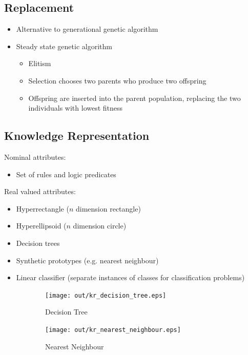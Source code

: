 \documentclass[a4paper]{article}
\begin{document}
\subsection{Replacement}

\begin{itemize}
  \item Alternative to generational genetic algorithm
  \item Steady state genetic algorithm
    \begin{itemize}
      \item Elitism
      \item Selection chooses two parents who produce two offspring
      \item Offspring are inserted into the parent population, replacing the
            two individuals with lowest fitness
    \end{itemize}
\end{itemize}

\subsection{Knowledge Representation}

Nominal attributes:

\begin{itemize}
  \item Set of rules and logic predicates
\end{itemize}

Real valued attributes:

\begin{itemize}
  \item Hyperrectangle ($n$ dimension rectangle)
  \item Hyperellipsoid ($n$ dimension circle)
  \item Decision trees
  \item Synthetic prototypes (e.g. nearest neighbour)
  \item Linear classifier (separate instances of classes for classification
        problems)
\end{itemize}

\begin{figure}[h]
  \centering
  \begin{subfigure}[b]{0.4\textwidth}
    \texttt{[image: out/kr\_decision\_tree.eps]}
    \caption{Decision Tree}
  \end{subfigure}
  \begin{subfigure}[b]{0.4\textwidth}
    \texttt{[image: out/kr\_nearest\_neighbour.eps]}
    \caption{Nearest Neighbour}
  \end{subfigure}
  \caption{}
  \label{fig:ga_knowledge_representations}
\end{figure}
\FloatBarrier
\end{document}
